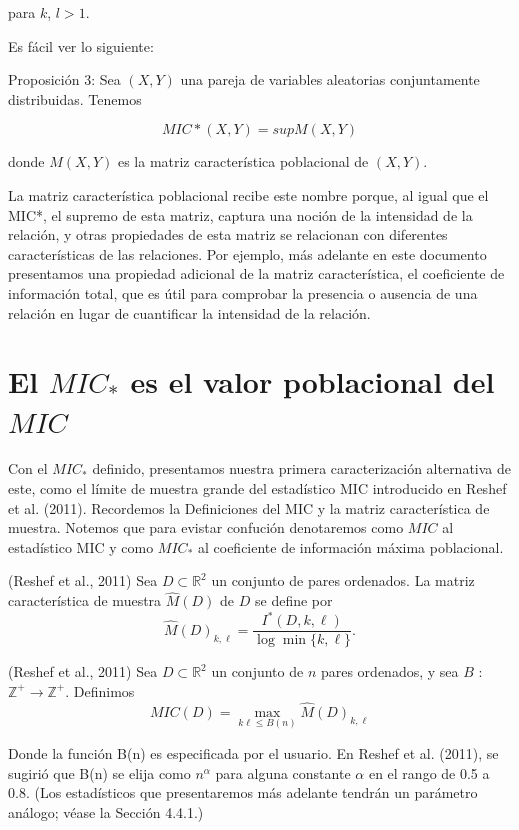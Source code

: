 	para $k$, $l > 1$.
	
	Es f\'acil ver lo siguiente:

	
	Proposici\'on 3: Sea $(X,Y)$ una pareja de variables aleatorias conjuntamente distribuidas. Tenemos
	
	$$MIC*(X,Y) = sup M(X,Y)$$
	
	donde $M(X,Y)$ es la matriz caracter\'istica poblacional de $(X,Y)$.
	
	La matriz caracter\'istica poblacional recibe este nombre porque, al igual que el MIC*, el supremo de esta matriz, captura una noci\'on de la intensidad de la relaci\'on, y otras propiedades de esta matriz se relacionan con diferentes caracter\'isticas de las relaciones. Por ejemplo, m\'as adelante en este documento presentamos una propiedad adicional de la matriz caracter\'istica, el coeficiente de informaci\'on total, que es \'util para comprobar la presencia o ausencia de una relaci\'on en lugar de cuantificar la intensidad de la relaci\'on.

	\section[short]{El $MIC_*$ es el valor poblacional del $MIC$}

	Con el $MIC_*$ definido, presentamos nuestra primera caracterizaci\'on alternativa de este, como el l\'imite de muestra grande del estad\'istico MIC introducido en Reshef et al. (2011). Recordemos la Definiciones del MIC y la matriz caracter\'istica de muestra. Notemos que para evistar confuci\'on denotaremos como $MIC$ al estad\'istico MIC y como $MIC_*$ al coeficiente de informaci\'on m\'axima poblacional.

	\begin{defn}
		(Reshef et al., 2011)  Sea $D \subset \mathbb{R}^2$ un conjunto de pares ordenados. La matriz caracter\'istica de muestra $\widehat{M}(D)$ de $D$ se define por
		$$
		\widehat{M}(D)_{k, \ell}=\frac{I^*(D, k, \ell)}{\log \min \{k, \ell\}} .
		$$
	\end{defn}

	\begin{defn}
		(Reshef et al., 2011) Sea $D \subset \mathbb{R}^2$ un conjunto de $n$ pares ordenados, y sea $B$ : $\mathbb{Z}^{+} \rightarrow \mathbb{Z}^{+}$. Definimos
		$$
		M I C(D)=\max _{k \ell \leq B(n)} \widehat{M}(D)_{k, \ell}
		$$
	\end{defn}

	Donde la funci\'on B(n) es especificada por el usuario. En Reshef et al. (2011), se sugiri\'o que B(n) se elija como $n^\alpha$ para alguna constante $\alpha$ en el rango de 0.5 a 0.8. (Los estad\'isticos que presentaremos m\'as adelante tendr\'an un par\'ametro an\'alogo; v\'ease la Secci\'on 4.4.1.)

